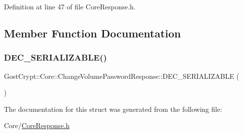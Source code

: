 Definition at line 47 of file Core\+Response.\+h.



\subsection{Member Function Documentation}
\mbox{\label{struct_gost_crypt_1_1_core_1_1_change_volume_password_response_a6f073f0481b0c86a63e477f581d2f2f3}} 
\subsubsection{\texorpdfstring{D\+E\+C\+\_\+\+S\+E\+R\+I\+A\+L\+I\+Z\+A\+B\+L\+E()}{DEC\_SERIALIZABLE()}}
{\footnotesize\ttfamily Gost\+Crypt\+::\+Core\+::\+Change\+Volume\+Password\+Response\+::\+D\+E\+C\+\_\+\+S\+E\+R\+I\+A\+L\+I\+Z\+A\+B\+LE (\begin{DoxyParamCaption}\item[{\hyperlink{struct_gost_crypt_1_1_core_1_1_change_volume_password_response}{Change\+Volume\+Password\+Response}}]{ }\end{DoxyParamCaption})}



The documentation for this struct was generated from the following file\+:\begin{DoxyCompactItemize}
\item 
Core/\hyperlink{_core_response_8h}{Core\+Response.\+h}\end{DoxyCompactItemize}
